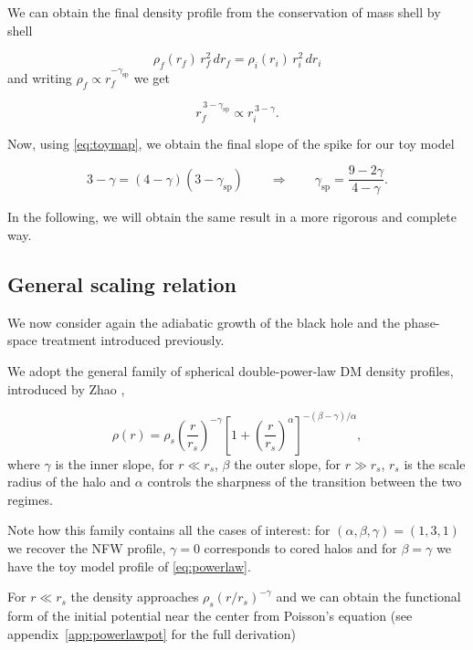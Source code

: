 We can obtain the final density profile from the conservation of mass shell by shell

\begin{equation}
    \rho_f(r_f)\, r_f^{2}\, dr_f = \rho_i(r_i)\, r_i^{2}\, dr_i
\end{equation}
and writing $\rho_f \propto r_f^{-\gamma_{\mathrm{sp}}}$ we get

\begin{equation}
    r_f^{\,3-\gamma_{\mathrm{sp}}} \propto r_i^{\,3-\gamma}.
\end{equation}

Now, using \cref{eq:toymap}, we obtain the final slope of the spike for our toy model

\begin{equation}
3-\gamma = (4-\gamma)\left(3-\gamma_{\mathrm{sp}}\right)
\qquad\Longrightarrow\qquad
\gamma_{\mathrm{sp}} = \frac{9-2\gamma}{4-\gamma}.
\end{equation}

In the following, we will obtain the same result in a more rigorous and complete way.


\subsection{General scaling relation} \label{sec:generalscaling}

We now consider again the adiabatic growth of the black hole and the phase-space treatment
introduced previously.

We adopt the general family of spherical double-power-law DM density profiles,
introduced by Zhao \cite{Zhao_1996},

\begin{equation} \label{eq:zhao}
\rho(r)
=
\rho_s
\left( \frac{r}{r_s} \right)^{-\gamma}
\left[ 1 + \left( \frac{r}{r_s} \right)^{\alpha} \right]^{-(\beta-\gamma)/\alpha},
\end{equation}
where $\gamma$ is the inner slope, for $r \ll r_s$, $\beta$ the outer slope, for $r \gg r_s$, $r_s$ is the scale radius of the halo and $\alpha$ controls the
sharpness of the transition between the two regimes.

Note how this family contains all the cases of interest:
for $(\alpha,\beta,\gamma) = (1,3,1)$ we recover the NFW profile,
$\gamma = 0$ corresponds to cored halos and for $\beta = \gamma$
we have the toy model profile of \cref{eq:powerlaw}.

For $r \ll r_s$ the density approaches $\rho_s (r/r_s)^{-\gamma}$ and 
we can obtain the functional form of the initial potential near the center from Poisson's equation (see appendix~\ref{app:powerlawpot} for the full derivation)

